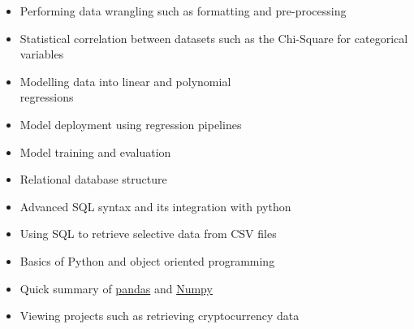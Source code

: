 \documentclass[11pt,a4paper,ragged2e]{altacv}
\begin{document}
\begin{paracol}{2}

\switchcolumn
\newpage

\begin{itemize}
\item Performing data wrangling  such as formatting and pre-processing
\item Statistical correlation between datasets such as the Chi-Square for categorical variables
\item Modelling data into linear and polynomial \\ regressions
\item Model deployment using regression pipelines
\item Model training and evaluation
\end{itemize}
\divider

\begin{itemize}
\item Relational database structure
\item Advanced SQL syntax and its integration with python
\item Using SQL to retrieve selective data from CSV files
\end{itemize}
\divider

\begin{itemize}
\item Basics of Python and object oriented programming
\item Quick summary of \href{https://pandas.pydata.org/}{pandas} and \href{https://numpy.org/}{Numpy}
\item Viewing projects such as retrieving cryptocurrency data
\end{itemize}
\divider


\end{paracol}
\end{document}
